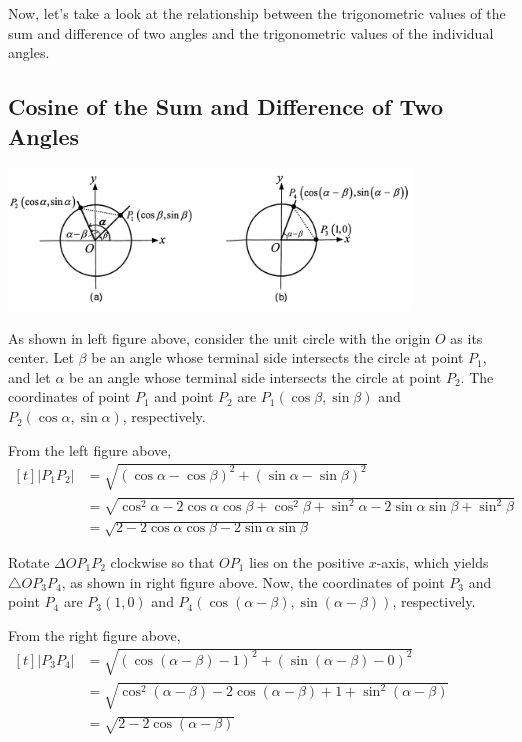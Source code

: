 \documentclass{report}
\begin{document}
Now, let's take a look at the relationship between the trigonometric values of the sum and difference of two angles and the trigonometric values of the individual angles.

\subsection*{Cosine of the Sum and Difference of Two Angles}

\begin{center}
	\includegraphics[width=0.8\textwidth]{assets/11-2.jpg}
\end{center}
\vspace{-2em}
As shown in left figure above, consider the unit circle with the origin \( O \) as its center. Let \( \beta \) be an angle whose terminal side intersects the circle at point \( P_1 \), and let \( \alpha \) be an angle whose terminal side intersects the circle at point \( P_2 \). The coordinates of point \( P_1 \) and point \( P_2 \) are \( P_1(\cos \beta, \sin \beta) \) and \( P_2(\cos \alpha, \sin \alpha) \), respectively.

\noindent From the left figure above, $\begin{aligned}[t]\left|P_1 P_2\right| & =\sqrt{(\cos \alpha-\cos \beta)^2+(\sin \alpha-\sin \beta)^2} \\ & =\sqrt{\cos ^2 \alpha-2 \cos \alpha \cos \beta+\cos ^2 \beta+\sin ^2 \alpha-2 \sin \alpha \sin \beta+\sin ^2 \beta} \\ & =\sqrt{2-2 \cos \alpha \cos \beta-2 \sin \alpha \sin \beta}\end{aligned}$

Rotate \( \Delta O P_1 P_2 \) clockwise so that \( O P_1 \) lies on the positive \( x \)-axis, which yields \( \triangle O P_3 P_4 \), as shown in right figure above. Now, the coordinates of point \( P_3 \) and point \( P_4 \) are \( P_3(1,0) \) and \( P_4(\cos (\alpha-\beta), \sin (\alpha-\beta)) \), respectively.

\noindent From the right figure above, $\begin{aligned}[t]\left|P_3 P_4\right| & =\sqrt{(\cos (\alpha-\beta)-1)^2+(\sin (\alpha-\beta)-0)^2} \\ & =\sqrt{\cos ^2(\alpha-\beta)-2 \cos (\alpha-\beta)+1+\sin ^2(\alpha-\beta)} \\ & =\sqrt{2-2 \cos (\alpha-\beta)}\end{aligned}$
\end{document}
